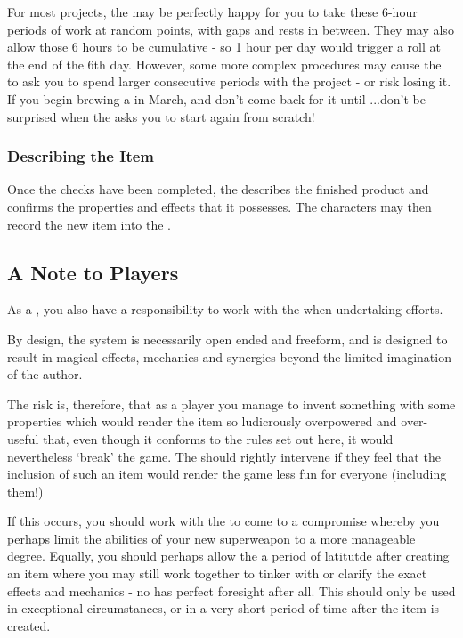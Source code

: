 For most projects, the  may be perfectly happy for you to take these 6-hour periods of work at random points, with gaps and rests in between. They may also allow those 6 hours to be cumulative - so 1 hour per day would trigger a roll at the end of the 6th day. However, some more complex procedures may cause the  to ask you to spend larger consecutive periods with the project - or risk losing it. If you begin brewing a  in March, and don't come back for it until ...don't be surprised when the  asks you to start again from scratch!
\subsubsection{Describing the Item}

Once the checks have been completed, the  describes the finished product and confirms the properties and effects that it possesses. The characters may then record the new item into the .


\subsection{A Note to Players}

As a , you also have a responsibility to work with the  when undertaking  efforts. 

By design, the  system is necessarily open ended and freeform, and is designed to result in magical effects, mechanics and synergies beyond the limited imagination of the author. 

The risk is, therefore, that as a player you manage to invent something with some properties which would render the item so ludicrously overpowered and over-useful that, even though it conforms to the rules set out here, it would nevertheless `break' the game. The  should rightly intervene if they feel that the inclusion of such an item would render the game less fun for everyone (including them!)

If this occurs, you should work with the  to come to a compromise whereby you perhaps limit the abilities of your new superweapon to a more manageable degree. Equally, you should perhaps allow the  a period of latitutde after creating an item where you may still work together to tinker with or clarify the exact effects and mechanics - no  has perfect foresight after all. This should only be used in exceptional circumstances, or in a very short period of time after the item is created. 
